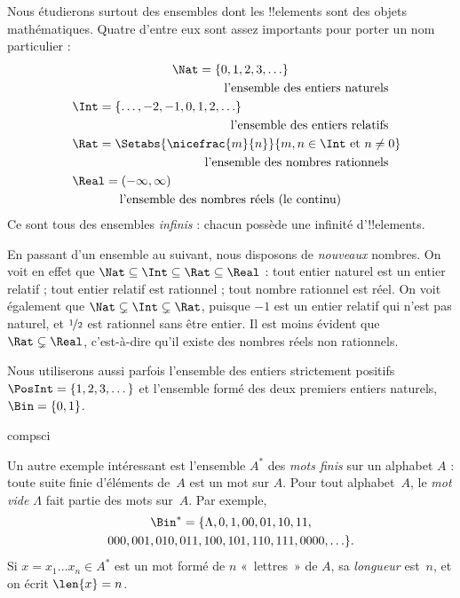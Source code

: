 \documentclass[11pt,a4paper,openany]{memoir}
\begin{document}

\begin{ex}
Nous étudierons surtout des ensembles dont les !!{element}s sont
des objets mathématiques. Quatre d'entre eux sont assez importants
pour porter un nom particulier :
\begin{multline*}
    \Nat = \{0, 1, 2, 3, \ldots\} \\
    \shoveright{\text{l'ensemble des entiers naturels}}\\
    \shoveleft{\Int = \{\ldots, -2, -1, 0, 1, 2, \ldots\}} \\
    \shoveright{\text{l'ensemble des entiers relatifs}}\\
    \shoveleft{\Rat = \Setabs{\nicefrac{m}{n}}{m, n \in \Int\text{ et }n \neq 0}}\\
    \shoveright{\text{l'ensemble des nombres rationnels}}\\
    \shoveleft{\Real = (-\infty, \infty)}\\
    \text{l'ensemble des nombres réels (le continu)}
\end{multline*}
Ce sont tous des ensembles \emph{infinis} : chacun possède une
infinité d'!!{element}s.

En passant d'un ensemble au suivant, nous disposons de
\emph{nouveaux} nombres. On voit en effet que
$\Nat \subseteq \Int \subseteq \Rat \subseteq \Real$ :
tout entier naturel est un entier relatif ; tout entier relatif
est rationnel ; tout nombre rationnel est réel.
On voit également que $\Nat \subsetneq \Int \subsetneq \Rat$,
puisque $-1$ est un entier relatif qui n'est pas naturel, et
$\nicefrac{1}{2}$ est rationnel sans être entier.
Il est moins évident que $\Rat \subsetneq \Real$, c'est-à-dire
qu'il existe des nombres réels non rationnels.

Nous utiliserons aussi parfois l'ensemble des entiers strictement
positifs $\PosInt = \{1, 2, 3, \dots\}$ et l'ensemble formé
des deux premiers entiers naturels, $\Bin = \{0, 1\}$.
\end{ex}

\begin{tagblock}{compsci}
\begin{ex}[Mots]
Un autre exemple intéressant est l'ensemble $A^{*}$ des
\emph{mots finis} sur un alphabet $A$ : toute suite finie
d'éléments de~$A$ est un mot sur $A$. Pour tout alphabet~$A$,
le \emph{mot vide $\Lambda$} fait partie des mots sur~$A$.
Par exemple,
\begin{multline*}
\Bin^*
=\{\Lambda,0,1,00,01,10,11,\\
000,001,010,011,100,101,110,111,0000,\ldots\}.
\end{multline*}
Si $x=x_{1}\ldots x_{n}\in A^{*}$ est un mot formé de $n$
«~lettres~» de $A$, sa \emph{longueur} est~$n$,
et on écrit $\len{x}=n$.
\end{ex}
\end{tagblock}
\end{document}

